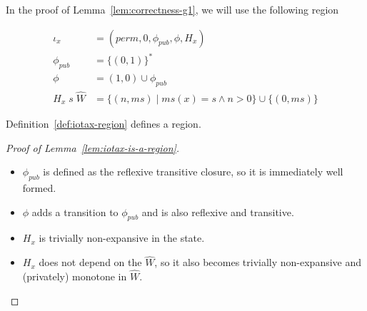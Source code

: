 \documentclass[a4paper]{article}
\newcommand{\forcenewline}{$\phantom{v}$\\}
\newcommand{\union}{\mathbin{\cup}}
\newcommand{\var}[1]{\mathit{#1}}
\newcommand{\hs}{\var{ms}}
\newcommand{\ms}{\hs}
\newcommand{\perm}{\var{perm}}
\newcommand{\pub}{\var{pub}}
\newcommand{\npair}[2][n]{\left(#1,#2 \right)}
\begin{document}
%
In the proof of Lemma~\ref{lem:correctness-g1}, we will use the following region
\begin{definition}
  \label{def:iotax-region}
  \begin{align*}
    \iota_x   & = (\perm, 0, \phi_\pub, \phi, H_x) \\
    \phi_\pub & = \{(0,1)\}^* \\
    \phi      & = (1,0) \union \phi_\pub \\
    H_x \; s \; \hat{W} & = \{\npair{\ms} \mid \ms(x) = s \land n > 0 \} \union \{\npair[0]{\ms}\}
  \end{align*}
\end{definition}
\begin{lemma}
  \label{lem:iotax-is-a-region}
  Definition~\ref{def:iotax-region} defines a region.
\end{lemma}
\begin{proof}[Proof of Lemma~\ref{lem:iotax-is-a-region}] \forcenewline
  \begin{itemize}
  \item $\phi_\pub$ is defined as the reflexive transitive closure, so it is immediately well formed.
  \item $\phi$ adds a transition to $\phi_\pub$ and is also reflexive and transitive. 
  \item $H_x$ is trivially non-expansive in the state.
  \item $H_x$ does not depend on the $\hat{W}$, so it also becomes trivially non-expansive and (privately) monotone in $\hat{W}$.
  \end{itemize}
\end{proof}
\end{document}
